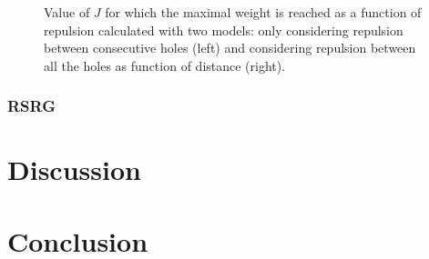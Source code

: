 \documentclass[ openright,titlepage,numbers=noenddot,headinclude,twoside,%
                footinclude=true,cleardoublepage=empty,abstractoff,%
                BCOR=5mm,paper=a4,fontsize=11pt,%
                ngerman,american,%
]{scrreprt}
\begin{document}
\begin{figure}[h!]
\begin{minipage}{0.4\textwidth}
    \end{minipage}
    \caption{\label{fig:} Value of $J$ for which the maximal weight is reached as a function of repulsion calculated with two models: only considering repulsion between consecutive holes (left) and considering repulsion between all the holes as function of distance (right). }
\end{figure}
\subsection{RSRG}

\chapter{Discussion}

\chapter{Conclusion}
\end{document}
